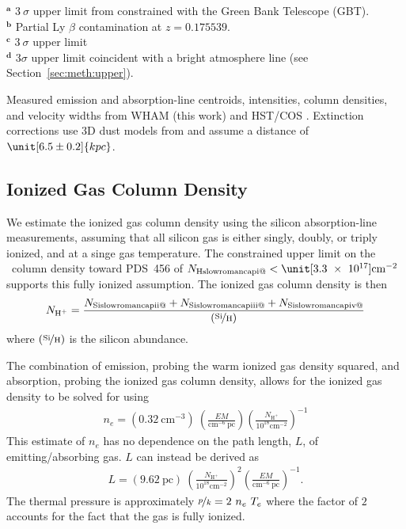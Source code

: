 \documentclass[twocolumn]{aastex63}
\makeatletter
\newcommand{\hi}{\ion{H}{1}}
\newcommand*{\rom}[1]{\expandafter\@slowromancap\romannumeral #1@}
\makeatother
\begin{document}
\begin{table*}[htb]
\begin{flushright}
$^\textbf{a}$ $3~\sigma$ upper limit from \citep{Fox2015} constrained with the Green Bank Telescope (GBT).\\
$^\textbf{b}$ Partial Ly $\beta$ contamination at $z = 0.175539$.\\
$^\textbf{c}$ $3~\sigma$ upper limit\\
$^\textbf{d}$ $3\sigma$ upper limit coincident with a bright atmosphere line (see Section~\ref{sec:meth:upper}).
\end{flushright}
\caption{Measured emission and absorption-line centroids, intensities, column densities, and velocity widths from WHAM (this work) and HST/COS \citep{Fox2015, Bordoloi2017}. Extinction corrections use 3D dust models from \citet{Green2019} and assume a distance of $\unit[6.5 \pm 0.2]{kpc}$.}
\label{tab:measurements}
\end{table*}


\subsection{Ionized Gas Column Density} 

We estimate the ionized gas column density using the silicon absorption-line measurements, assuming that all silicon gas is either singly, doubly, or triply ionized, and at a singe gas temperature. The constrained upper limit on the \hi\ column density toward PDS~456 of $N_{\textrm{H\rom{1}}} < \unit[3.3~\times~10^{17}]{\textrm{cm}^{-2}}$ \citep{Fox2015} supports this fully ionized assumption. The ionized gas column density is then
\begin{equation}
    N_{\textrm{H}^+} = \frac{N_{\textrm{Si\rom{2}}} + N_{\textrm{Si\rom{3}}} + N_{\textrm{Si\rom{4}}}}{\left( \nicefrac{\textrm{Si}}{\textrm{H}} \right)}\label{eq:SiTot}
\end{equation}
where $\left( \nicefrac{\textrm{Si}}{\textrm{H}} \right)$ is the silicon abundance.  

The combination of emission, probing the warm ionized gas density squared, and absorption, probing the ionized gas column density, allows for the ionized gas density to be solved for using 
\begin{equation}
\begin{split}
    n_e = \left( 0.32~\textrm{cm}^{-3}\right)~ \left(\frac{EM}{\textrm{cm}^{-6}~\textrm{pc}}\right)\left(\frac{N_{\textrm{H}^+}}{10^{18}\textrm{cm}^{-2}}\right)^{-1}\label{eq:ne_combo}
\end{split}
\end{equation}
This estimate of $n_e$ has no dependence on the path length, $L$, of emitting/absorbing gas. $L$ can instead be derived as
\begin{equation}
\begin{split}
   L = \left( 9.62~\textrm{pc}\right)~ \left(\frac{N_{\textrm{H}^+}}{10^{18}\textrm{cm}^{-2}}\right)^{2} \left(\frac{EM}{\textrm{cm}^{-6}~\textrm{pc}}\right)^{-1}.\label{eq:L_combo}
\end{split}
\end{equation}
The thermal pressure is approximately $\nicefrac{p}{k} = 2~n_e~T_e$
where the factor of $2$ accounts for the fact that the gas is fully ionized. 
\end{document}
